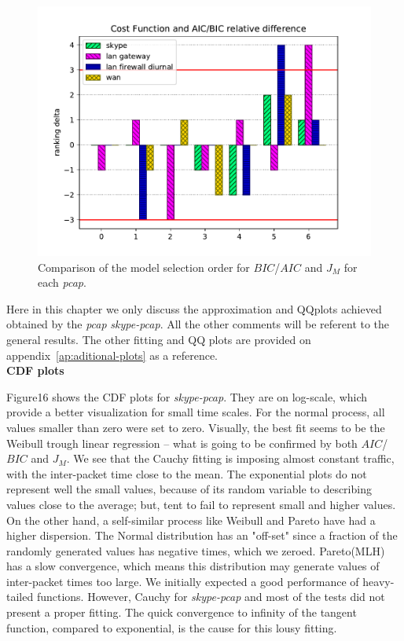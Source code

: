 \begin{figure}[ht!]
\includegraphics[scale=0.8]{figures/ch4/aicbic-costfunction-relative-diff}
\caption{Comparison of the model selection order for $BIC$/$AIC$ and  $J_M$ for each \textit{pcap}.}
\label{fig:cost-function_vs_aic-bic}
\end{figure}


Here in this chapter we only discuss the approximation and QQplots achieved obtained by the \textit{pcap} \textit{skype-pcap}. All the other comments will be referent to the general results. The other fitting and QQ plots are provided on appendix~\ref{ap:aditional-plots} as a reference. \\


\noindent \textbf{CDF plots}

Figure16  shows the CDF plots for \textit{skype-pcap}. They are on log-scale, which provide a better visualization for small time scales. For the normal process, all values smaller than zero were set to zero. Visually, the best fit seems to be the Weibull trough linear regression -- what is going to be confirmed by both $AIC$/$BIC$ and $J_M$. We see that the Cauchy fitting is imposing almost constant traffic, with the inter-packet time close to the mean. The exponential plots do not represent well the small values, because of its random variable to describing values close to the average; but,  tent to fail to represent small and higher values.
On the other hand, a self-similar process like Weibull and Pareto have had a higher dispersion.  The Normal distribution has an "off-set" since a fraction of the randomly generated values has negative times, which we zeroed. Pareto(MLH) has a slow convergence, which means this distribution may generate values of inter-packet times too large. We initially expected a good performance of heavy-tailed functions. However, Cauchy for \textit{skype-pcap} and most of the tests did not present a proper fitting. The quick convergence to infinity of the tangent function, compared to exponential, is the cause for this lousy fitting. \\


